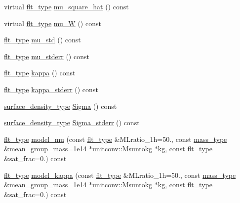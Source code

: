\begin{DoxyCompactItemize}
\item 
virtual \hyperlink{lib_2IceBRG__main_2common_8h_ad0f130a56eeb944d9ef2692ee881ecc4}{flt\-\_\-type} \hyperlink{classIceBRG_1_1pair__bin__summary_a1946f8d7063520c70f8f68b705aef8d7}{mu\-\_\-square\-\_\-hat} () const 
\item 
virtual \hyperlink{lib_2IceBRG__main_2common_8h_ad0f130a56eeb944d9ef2692ee881ecc4}{flt\-\_\-type} \hyperlink{classIceBRG_1_1pair__bin__summary_a88ff7f5597f4a10a16fda4bb9f726298}{mu\-\_\-\-W} () const 
\item 
\hyperlink{lib_2IceBRG__main_2common_8h_ad0f130a56eeb944d9ef2692ee881ecc4}{flt\-\_\-type} \hyperlink{classIceBRG_1_1pair__bin__summary_a16bcf11da5f0bd64f763c7012c4584de}{mu\-\_\-std} () const 
\item 
\hyperlink{lib_2IceBRG__main_2common_8h_ad0f130a56eeb944d9ef2692ee881ecc4}{flt\-\_\-type} \hyperlink{classIceBRG_1_1pair__bin__summary_adf391f518873ac7ae22dd0f8aeb74a3d}{mu\-\_\-stderr} () const 
\item 
\hyperlink{lib_2IceBRG__main_2common_8h_ad0f130a56eeb944d9ef2692ee881ecc4}{flt\-\_\-type} \hyperlink{classIceBRG_1_1pair__bin__summary_ae53878e5bc3fdeefd0884231a11337dd}{kappa} () const 
\item 
\hyperlink{lib_2IceBRG__main_2common_8h_ad0f130a56eeb944d9ef2692ee881ecc4}{flt\-\_\-type} \hyperlink{classIceBRG_1_1pair__bin__summary_a91ad26c5cb4049d449b217cd45603696}{kappa\-\_\-stderr} () const 
\item 
\hyperlink{namespaceIceBRG_a80c597ef5ba0a32491d32a9f0083b02d}{surface\-\_\-density\-\_\-type} \hyperlink{classIceBRG_1_1pair__bin__summary_a0e3ba1f366541d48ef94679b4352bbcd}{Sigma} () const 
\item 
\hyperlink{namespaceIceBRG_a80c597ef5ba0a32491d32a9f0083b02d}{surface\-\_\-density\-\_\-type} \hyperlink{classIceBRG_1_1pair__bin__summary_a5aa0edcb2a8528aa090e5035131703a0}{Sigma\-\_\-stderr} () const 
\item 
\hyperlink{lib_2IceBRG__main_2common_8h_ad0f130a56eeb944d9ef2692ee881ecc4}{flt\-\_\-type} \hyperlink{classIceBRG_1_1pair__bin__summary_ac0852be69cc6c7fb267d871e5119a848}{model\-\_\-mu} (const \hyperlink{lib_2IceBRG__main_2common_8h_ad0f130a56eeb944d9ef2692ee881ecc4}{flt\-\_\-type} \&M\-Lratio\-\_\-1h=50., const \hyperlink{namespaceIceBRG_a1be72ac4918a9b029f2eefa084213e35}{mass\-\_\-type} \&mean\-\_\-group\-\_\-mass=1e14 $\ast$unitconv\-::\-Msuntokg $\ast$kg, const flt\-\_\-type \&sat\-\_\-frac=0.) const 
\item 
\hyperlink{lib_2IceBRG__main_2common_8h_ad0f130a56eeb944d9ef2692ee881ecc4}{flt\-\_\-type} \hyperlink{classIceBRG_1_1pair__bin__summary_aa93614ecebce56d9336d856925ed1154}{model\-\_\-kappa} (const \hyperlink{lib_2IceBRG__main_2common_8h_ad0f130a56eeb944d9ef2692ee881ecc4}{flt\-\_\-type} \&M\-Lratio\-\_\-1h=50., const \hyperlink{namespaceIceBRG_a1be72ac4918a9b029f2eefa084213e35}{mass\-\_\-type} \&mean\-\_\-group\-\_\-mass=1e14 $\ast$unitconv\-::\-Msuntokg $\ast$kg, const flt\-\_\-type \&sat\-\_\-frac=0.) const 

\end{DoxyCompactItemize}
